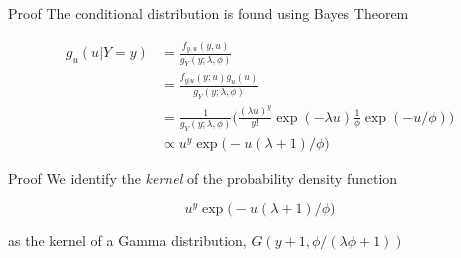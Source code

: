 \documentclass[aspectratio=169]{beamer}
\begin{document}
\begin{frame}{Proof}
\protect\hypertarget{proof-3}{}
The conditional distribution is found using Bayes Theorem

\begin{equation}
  \begin{aligned}
    g_{u}(u|Y=y)&=\frac{f_{y,u}(y,u)}{g_Y(y;\lambda, \phi)} \\
    &=\frac{f_{y|u}(y;u)g_{u}(u)}{g_{Y}(y;\lambda,\phi)} \\
    &=\frac{1}{g_{Y}(y;\lambda,\phi)}\bigg(\frac{(\lambda u)^y}{y!} \exp (-\lambda u) \frac{1}{\phi} \exp (-u/\phi) \bigg) \\
    &\propto u^{y} \exp \big(- u(\lambda+1)/\phi\big)
  \end{aligned}
\end{equation}
\end{frame}

\begin{frame}{Proof}
\protect\hypertarget{proof-4}{}
We identify the \emph{kernel} of the probability density function

\begin{equation}
  u^{y} \exp \big(- u(\lambda+1)/\phi\big)
\end{equation}

as the kernel of a Gamma distribution, \(G(y+1,\phi/(\lambda \phi+1))\)
\end{frame}
\end{document}
